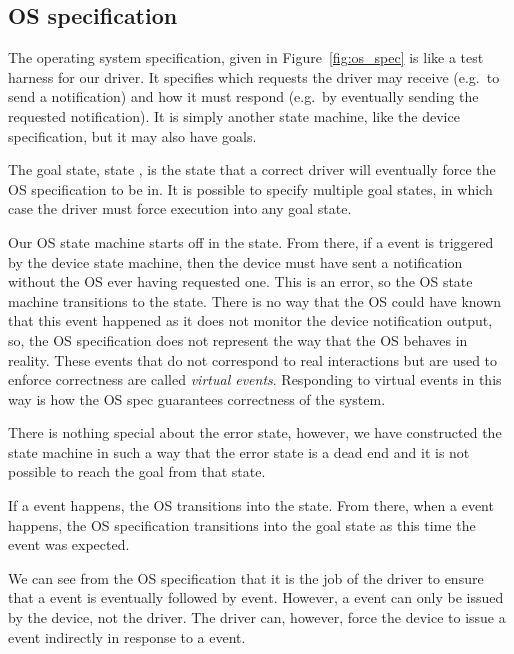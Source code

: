 \subsection{OS specification}

The operating system specification, given in Figure~\ref{fig:os_spec} is like a test harness for our driver. It specifies which requests the driver may receive (e.g.\ to send a notification) and how it must respond (e.g.\ by eventually sending the requested notification). It is simply another state machine, like the device specification, but it may also have goals.

The goal state, state , is the state that a correct driver will eventually force the OS specification to be in. It is possible to specify multiple goal states, in which case the driver must force execution into any goal state.

Our OS state machine starts off in the  state. From there, if a  event is triggered by the device state machine, then the device must have sent a notification without the OS ever having requested one. This is an error, so the OS state machine transitions to the  state. There is no way that the OS could have known that this event happened as it does not monitor the device notification output, so, the OS specification does not represent the way that the OS behaves in reality. These events that do not correspond to real interactions but are used to enforce correctness are called \emph{virtual events}. Responding to virtual events in this way is how the OS spec guarantees correctness of the system. 

There is nothing special about the error state, however, we have constructed the state machine in such a way that the error state is a dead end and it is not possible to reach the goal from that state.

If a  event happens, the OS transitions into the  state. From there, when a  event happens, the OS specification transitions into the goal state as this time the  event was expected. 

We can see from the OS specification that it is the job of the driver to ensure that a  event is eventually followed by  event. However, a  event can only be issued by the device, not the driver. The driver can, however, force the device to issue a  event indirectly in response to a  event. 

